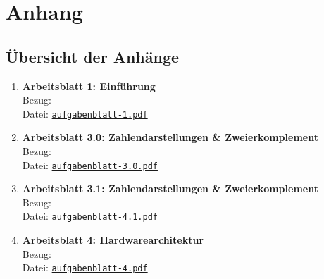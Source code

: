\documentclass[../skript/main.tex]{subfiles}
\begin{document}
	
	
	\clearpage
	\chapter*{Anhang}
	\thispagestyle{plain}
	
	\section*{Übersicht der Anhänge}
	\begin{enumerate}
		\item \textbf{Arbeitsblatt 1: Einführung}\\
		Bezug: \\
		\small Datei: \hyperlink{ab1}{\texttt{aufgabenblatt-1.pdf}}
		
		\item \textbf{Arbeitsblatt 3.0: Zahlendarstellungen \& Zweierkomplement}\\
		Bezug: \\
		\small Datei: \hyperlink{ab3.0}{\texttt{aufgabenblatt-3.0.pdf}}
		
		\item \textbf{Arbeitsblatt 3.1: Zahlendarstellungen \& Zweierkomplement}\\
		Bezug: \\
		\small Datei: \hyperlink{ab3.1}{\texttt{aufgabenblatt-4.1.pdf}}
		
		\item \textbf{Arbeitsblatt 4: Hardwarearchitektur}\\
		Bezug: \\
		\small Datei: \hyperlink{ab4}{\texttt{aufgabenblatt-4.pdf}}
	\end{enumerate}
	
\end{document}
